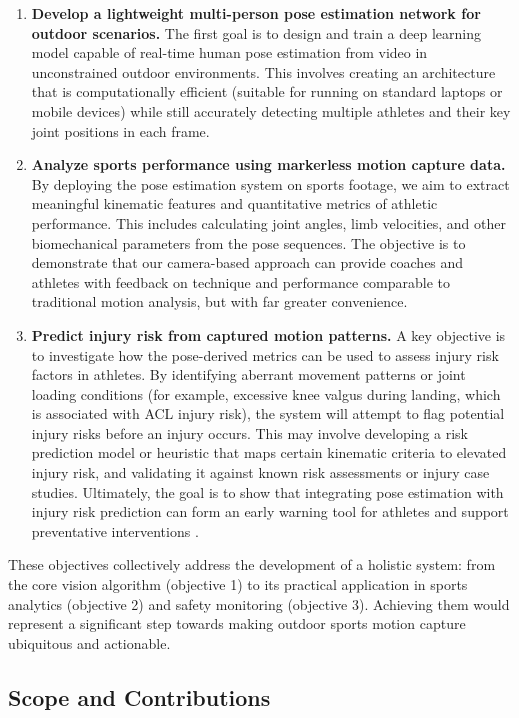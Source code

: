 \begin{enumerate}
\item \textbf{Develop a lightweight multi-person pose estimation network for outdoor scenarios.} The first goal is to design and train a deep learning model capable of real-time human pose estimation from video in unconstrained outdoor environments. This involves creating an architecture that is computationally efficient (suitable for running on standard laptops or mobile devices) while still accurately detecting multiple athletes and their key joint positions in each frame.
\item \textbf{Analyze sports performance using markerless motion capture data.} By deploying the pose estimation system on sports footage, we aim to extract meaningful kinematic features and quantitative metrics of athletic performance. This includes calculating joint angles, limb velocities, and other biomechanical parameters from the pose sequences. The objective is to demonstrate that our camera-based approach can provide coaches and athletes with feedback on technique and performance comparable to traditional motion analysis, but with far greater convenience.
\item \textbf{Predict injury risk from captured motion patterns.} A key objective is to investigate how the pose-derived metrics can be used to assess injury risk factors in athletes. By identifying aberrant movement patterns or joint loading conditions (for example, excessive knee valgus during landing, which is associated with ACL injury risk), the system will attempt to flag potential injury risks before an injury occurs. This may involve developing a risk prediction model or heuristic that maps certain kinematic criteria to elevated injury risk, and validating it against known risk assessments or injury case studies. Ultimately, the goal is to show that integrating pose estimation with injury risk prediction can form an early warning tool for athletes and support preventative interventions \cite{Blanchard2019}.
\end{enumerate} These objectives collectively address the development of a holistic system: from the core vision algorithm (objective 1) to its practical application in sports analytics (objective 2) and safety monitoring (objective 3). Achieving them would represent a significant step towards making outdoor sports motion capture ubiquitous and actionable. \subsection{Scope and Contributions}
